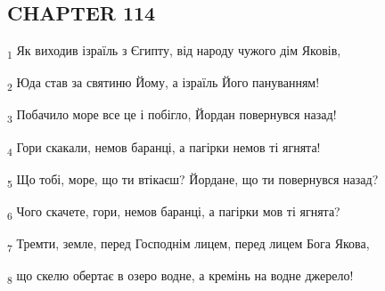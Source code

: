 \subsection{CHAPTER 114}
\begin{tcolorbox}
\textsubscript{1} Як виходив ізраїль з Єгипту, від народу чужого дім Яковів,
\end{tcolorbox}
\begin{tcolorbox}
\textsubscript{2} Юда став за святиню Йому, а ізраїль Його пануванням!
\end{tcolorbox}
\begin{tcolorbox}
\textsubscript{3} Побачило море все це і побігло, Йордан повернувся назад!
\end{tcolorbox}
\begin{tcolorbox}
\textsubscript{4} Гори скакали, немов баранці, а пагірки немов ті ягнята!
\end{tcolorbox}
\begin{tcolorbox}
\textsubscript{5} Що тобі, море, що ти втікаєш? Йордане, що ти повернувся назад?
\end{tcolorbox}
\begin{tcolorbox}
\textsubscript{6} Чого скачете, гори, немов баранці, а пагірки мов ті ягнята?
\end{tcolorbox}
\begin{tcolorbox}
\textsubscript{7} Тремти, земле, перед Господнім лицем, перед лицем Бога Якова,
\end{tcolorbox}
\begin{tcolorbox}
\textsubscript{8} що скелю обертає в озеро водне, а кремінь на водне джерело!
\end{tcolorbox}
